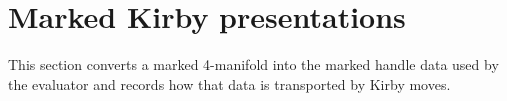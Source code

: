 \section{Marked Kirby presentations}
\label{sec:kirby-presentations}

This section converts a marked 4-manifold into the marked handle data used
by the evaluator and records how that data is transported by Kirby moves.



